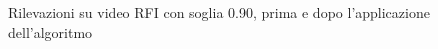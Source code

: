 \begin{figure}[]
    \begin{minipage}{.5\linewidth}
        \centering
    \end{minipage}%
    \begin{minipage}{.5\linewidth}
        \centering
    \end{minipage}
    \centering
    \caption{Rilevazioni su video RFI con soglia 0.90, prima e dopo l'applicazione dell'algoritmo}
    \label{fig:alg_0}
\end{figure}
